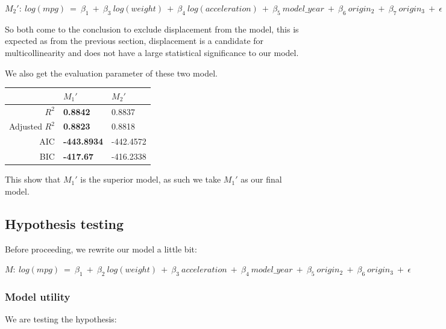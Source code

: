 \begin{center}
$
M_2': \ log(mpg) \ = \ \beta_1 \ + \ \beta_3 \ log(weight) \ + \ \beta_4 \ log(acceleration) \ + \ \beta_5 \ model\_year \ + \ \beta_6 \ origin_2 \ + \ \beta_7 \ origin_3 \ + \ \epsilon
$
\end{center}

So both come to the conclusion to exclude displacement from the model, this is expected as from the previous section, displacement is a candidate for multicollinearity and does not have a large statistical significance to our model.

We also get the evaluation parameter of these two model.

\begin{table}[H]
\centering
{}
\begin{tabular}{rll}
  \hline
               & $M_1'$             & $M_2'$    \\
    \hline
$R^2$          & \textbf{0.8842}    & 0.8837    \\
Adjusted $R^2$ & \textbf{0.8823}    & 0.8818    \\
AIC            & \textbf{-443.8934} & -442.4572 \\
BIC            & \textbf{-417.67}   & -416.2338 \\
   \hline
\end{tabular}
\label{tab:vif}
\end{table}

This show that $M_1'$ is the superior model, as such we take $M_1'$ as our final model.

\subsection{Hypothesis testing}

Before proceeding, we rewrite our model a little bit:

\begin{center}
$
M: \ log(mpg) \ = \ \beta_1 \ + \ \beta_2 \ log(weight) \ + \ \beta_3 \ acceleration \ + \ \beta_4 \ model\_year \ + \ \beta_5 \ origin_2 \ + \ \beta_6 \ origin_3 \ + \ \epsilon
$
\end{center}

\subsubsection{Model utility}

We are testing the hypothesis:

